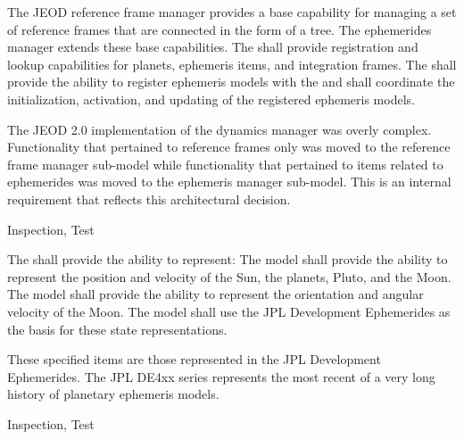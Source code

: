 \label{reqt:ephem_manager}
\begin{description:}
\item[Requirement]
  The JEOD reference frame manager provides a base capability for managing
  a set of reference frames that are connected in the form of a tree.
  The \ModelDesc ephemerides manager extends these base capabilities.
  The \ModelDesc shall provide registration and lookup capabilities for
  planets, ephemeris items, and integration frames.
  The \ModelDesc shall provide the ability to register ephemeris models
  with the \ModelDesc and shall coordinate the initialization, activation,
  and updating of the registered ephemeris models.
\item[Rationale]
  The JEOD 2.0 implementation of the dynamics manager was overly complex.
  Functionality that pertained to reference frames only was moved to the
  reference frame manager sub-model while functionality that pertained to items
  related to ephemerides was moved to the ephemeris manager sub-model. 
  This is an internal requirement that reflects this architectural decision.
\item[Verification]
  Inspection, Test
\end{description:}

\label{reqt:solar_system}
\begin{description:}
\item[Requirement]
  The \ModelDesc shall provide the ability to represent:
  The model shall provide the ability to represent the position and velocity
  of the Sun, the planets, Pluto, and the Moon.
  The model shall provide the ability to represent the orientation and angular
  velocity of the Moon.
  The model shall use the JPL Development Ephemerides as the basis for
  these state representations.
\item[Rationale]
  These specified items are those represented in the JPL Development
  Ephemerides. The JPL DE4xx series represents the most recent of a very
  long history of planetary ephemeris models.
\item[Verification]
  Inspection, Test
\end{description:}


